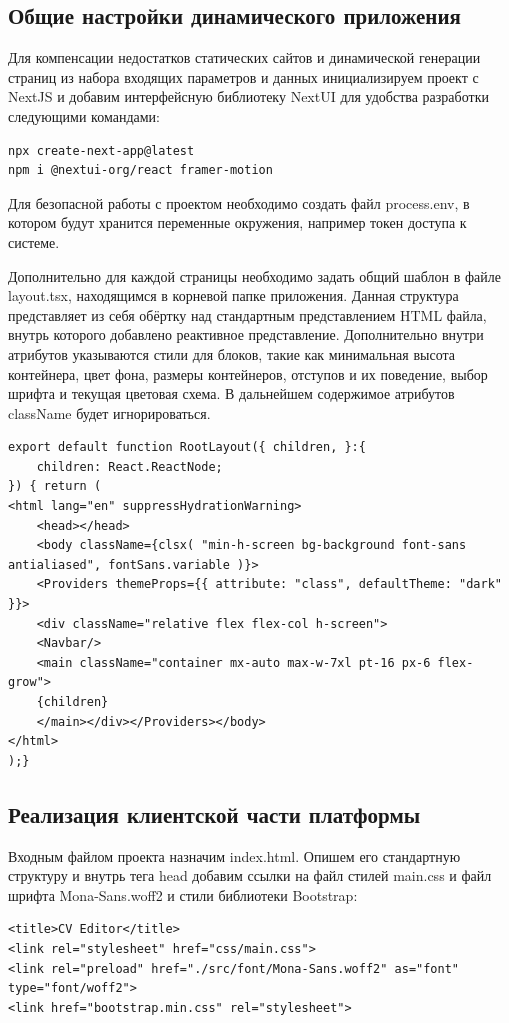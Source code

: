 \documentclass[master, och, diploma]{SCWorks}
\begin{document}
\subsection{Общие настройки динамического приложения}
Для компенсации недостатков статических сайтов и динамической генерации страниц из набора входящих параметров и данных инициализируем проект с NextJS и добавим интерфейсную библиотеку NextUI для удобства разработки следующими командами:
\begin{verbatim}
npx create-next-app@latest
npm i @nextui-org/react framer-motion
\end{verbatim}

Для безопасной работы с проектом необходимо создать файл process.env, в котором будут хранится переменные окружения, например токен доступа к системе.

Дополнительно для каждой страницы необходимо задать общий шаблон в файле layout.tsx, находящимся в корневой папке приложения. Данная структура представляет из себя обёртку над стандартным представлением HTML файла, внутрь которого добавлено реактивное представление. Дополнительно внутри атрибутов указываются стили для блоков, такие как минимальная высота контейнера, цвет фона, размеры контейнеров, отступов и их поведение, выбор шрифта и текущая цветовая схема. В дальнейшем содержимое атрибутов className будет  игнорироваться. 
\begin{verbatim}
export default function RootLayout({ children, }:{
	children: React.ReactNode;
}) { return (
<html lang="en" suppressHydrationWarning>  
    <head></head>
    <body className={clsx( "min-h-screen bg-background font-sans antialiased", fontSans.variable )}>
    <Providers themeProps={{ attribute: "class", defaultTheme: "dark" }}>
    <div className="relative flex flex-col h-screen">
    <Navbar/>
    <main className="container mx-auto max-w-7xl pt-16 px-6 flex-grow">
    {children}
    </main></div></Providers></body>
</html>
);}
\end{verbatim}



\subsection{Реализация клиентской части платформы}
Входным файлом проекта назначим index.html. Опишем его стандартную структуру и внутрь тега head добавим ссылки на файл стилей main.css и файл шрифта Mona-Sans.woff2 и стили библиотеки Bootstrap:
\begin{verbatim}
<title>CV Editor</title>
<link rel="stylesheet" href="css/main.css">
<link rel="preload" href="./src/font/Mona-Sans.woff2" as="font" type="font/woff2">
<link href="bootstrap.min.css" rel="stylesheet">
\end{verbatim}
\end{document}
